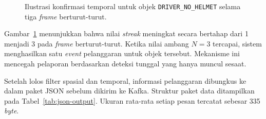 \begin{figure}[htbp]
\centering
{}
\caption{Ilustrasi konfirmasi temporal untuk objek \texttt{DRIVER\_NO\_HELMET} selama tiga \textit{frame} berturut-turut.}
\label{fig:streak-timeline}
\end{figure}

Gambar~\ref{fig:streak-timeline} menunjukkan bahwa nilai \textit{streak} meningkat secara bertahap dari 1 menjadi 3 pada \textit{frame} berturut-turut. Ketika nilai ambang $N=3$ tercapai, sistem menghasilkan satu \textit{event} pelanggaran untuk objek tersebut. Mekanisme ini mencegah pelaporan berdasarkan deteksi tunggal yang hanya muncul sesaat.

Setelah lolos filter spasial dan temporal, informasi pelanggaran dibungkus ke dalam paket JSON sebelum dikirim ke Kafka. Struktur paket data ditampilkan pada Tabel~\ref{tab:json-output}. Ukuran rata-rata setiap pesan tercatat sebesar 335 \textit{byte}.


